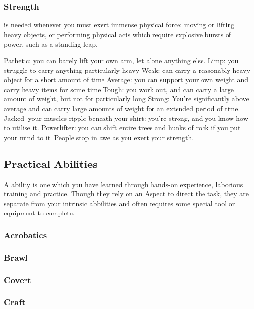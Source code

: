 \subsubsection{Strength}

 is needed whenever you must exert immense physical force: moving or lifting heavy objects, or performing physical acts which require explosive bursts of power, such as a standing leap. 


 \ratingTable
 {Pathetic: you can barely lift your own arm, let alone anything else.}
 {Limp: you struggle to carry anything particularly heavy}
 {Weak: can carry a reasonably heavy object for a short amount of time}
 {Average: you can support your own weight and carry heavy items for some time}
 {Tough: you work out, and can carry a large amount of weight, but not for particularly long}
 {Strong: You're significantly above average and can carry large amounts of weight for an extended period of time. }
 {Jacked: your muscles ripple beneath your shirt: you're strong, and you know how to utilise it.}
 {Powerlifter: you can shift entire trees and hunks of rock if you put your mind to it. People stop in awe as you exert your strength.}


\subsection{Practical Abilities}


A  ability is one which you have learned through hands-on experience, laborious training and practice. Though they rely on an Aspect to direct the task, they are separate from your intrinsic abbilities and often requires some special tool or equipment to complete. 

\subsubsection{Acrobatics}

\subsubsection{Brawl}

\subsubsection{Covert}

\subsubsection{Craft}

